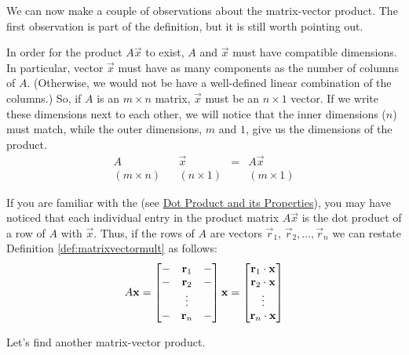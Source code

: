 \documentclass{ximera}
\begin{document}
We can now make a couple of observations about the matrix-vector product.  The first observation is part of the definition, but it is still worth pointing out.
\begin{observation}\label{obs:mat0020_obs1}
In order for the product $A\vec{x}$ to exist, $A$ and $\vec{x}$ must have compatible dimensions.  In particular, vector $\vec{x}$ must have as many components as the number of columns of $A$.  (Otherwise, we would not be have a well-defined linear combination of the columns.)  So, if $A$ is an $m\times n$ matrix, $\vec{x}$ must be an $n\times 1$ vector.  If we write these dimensions next to each other, we will notice that the inner dimensions ($n$) must match, while the outer dimensions, $m$ and $1$, give us the dimensions of the product.
$$\begin{array}{ccccc}
A& & \vec{x} &=& A\vec{x}\\
(m\times n) & &(n\times 1) & &(m\times 1)
\end{array}$$
\end{observation}

\begin{observation}\label{obs:mat0020_obs2}
    If you are familiar with the  (see \href{https://ximera.osu.edu/linearalgebradzv3/LinearAlgebraInteractiveIntro/VEC-0050/main}{Dot Product and its Properties}), you may have noticed that each individual entry in the product matrix $A\vec{x}$ is the dot product of a row of $A$ with $\vec{x}$.  Thus, if the rows of $A$ are vectors $\vec{r}_1$, $\vec{r}_2,\ldots ,\vec{r}_n$ we can restate Definition \ref{def:matrixvectormult} as follows:
$$A\mathbf{x}=\begin{bmatrix}-&\mathbf{r}_1&-\\-&\mathbf{r}_2&-\\ &\vdots & \\-&\mathbf{r}_n &-\end{bmatrix}\mathbf{x}=\begin{bmatrix}\mathbf{r}_1\cdot\mathbf{x}\\\mathbf{r}_2\cdot\mathbf{x}\\\vdots\\\mathbf{r}_n\cdot\mathbf{x}\end{bmatrix}$$
\end{observation}

Let's find another matrix-vector product.
\end{document}
